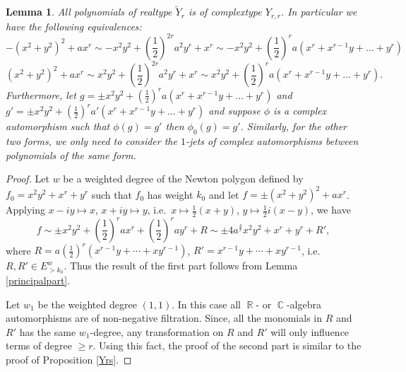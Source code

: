 \documentclass[noend]{amsproc}
\newtheorem{lemma}[theorem]{Lemma}
\theoremstyle{definition}
\DeclareMathOperator{\R}{\mathbb{R}}
\DeclareMathOperator{\C}{\mathbb{C}}
\begin{document}
\begin{lemma}\label{equivalences}
All polynomials of realtype $\widetilde Y_{r}$ is of complextype $Y_{r,r}$. In particular we have the following equivalences:
\[-(x^2+y^2)^2+ax^r\sim -x^2y^2+\left(\frac{1}{2}\right)^{2r}a^2y^r+x^r\sim -x^2y^2+\left(\frac{1}{2}\right)^ra(x^r+x^{r-1}y+\ldots+y^r)\]
\[(x^2+y^2)^2+ax^r\sim x^2y^2+\left(\frac{1}{2}\right)^{2r}a^2y^r+x^r\sim x^2y^2+\left(\frac{1}{2}\right)^ra(x^r+x^{r-1}y+\ldots+y^r).\] 
Furthermore, let $g= \pm x^2y^2+\left(\frac{1}{2}\right)^ra(x^r+x^{r-1}y+\ldots+y^r)$ and $g'= \pm x^2y^2+\left(\frac{1}{2}\right)^ra'(x^r+x^{r-1}y+\ldots+y^r)$ and suppose $\phi$ is a complex automorphism such that $\phi(g)=g'$ then $\phi_0(g)=g'$. Similarly, for the other two forms, we only need to consider the $1$-jets of complex automorphisms between polynomials of the same form.
\end{lemma}
\begin{proof}
Let $w$ be a weighted degree of the Newton polygon defined by $f_0=x^2y^2+x^r+y^r$ such that $f_0$ has weight $k_0$ and let $f=\pm(x^2+y^2)^2+ax^r$. Applying $x-iy\mapsto x$, $x+iy\mapsto y$, i.e.~$x\mapsto\frac{1}{2}(x+y)$, $y\mapsto\frac{1}{2}i(x-y)$, we have
\[f\sim\pm x^2y^2+\left(\frac{1}{2}\right)^rax^r+\left(\frac{1}{2}\right)^ray^r+R\sim \pm 4a^{\frac{4}{r}}x^2y^2+x^r+y^r+R',\]
where $R=a\left(\frac{1}{2}\right)^r(x^{r-1}y+\cdots+xy^{r-1})$, $R'=x^{r-1}y+\cdots+xy^{r-1}$, i.e.~$R,R'\in E_{>k_0}^w$.
Thus the result of the first part follows from Lemma \ref{principalpart}. 

Let $w_1$ be the weighted degree $(1,1)$. In this case all $\R$- or $\C$-algebra automorphisms are of non-negative filtration. Since, all the monomials in $R$ and $R'$ has the same $w_1$-degree, any transformation on $R$ and $R'$ will only influence terms of degree $\ge r$. Using this fact, the proof of the second part is similar to the proof of Proposition \ref{Yrs}.
\end{proof}
\end{document}
